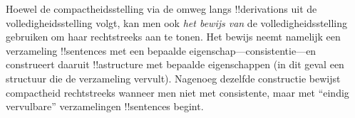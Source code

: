 \documentclass[../../../include/open-logic-section]{subfiles}
\begin{document}
Hoewel de compactheidsstelling via de omweg langs !!{derivation}s uit
de volledigheidsstelling volgt, kan men ook \emph{het bewijs van} de
volledigheidsstelling gebruiken om haar rechtstreeks aan te tonen. Het
bewijs neemt namelijk een verzameling !!{sentence}s met een bepaalde
eigenschap---consistentie---en construeert daaruit !!a{structure} met
bepaalde eigenschappen (in dit geval een structuur die de verzameling
vervult). Nagenoeg dezelfde constructie bewijst compactheid
rechtstreeks wanneer men niet met consistente, maar met ``eindig
vervulbare'' verzamelingen !!{sentence}s begint.
\end{document}
